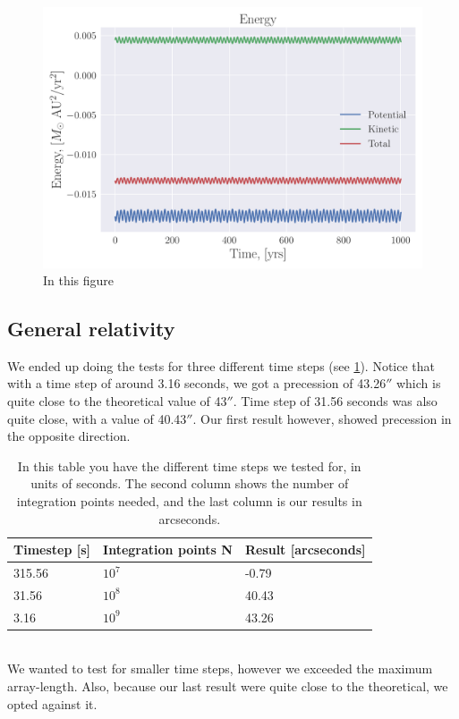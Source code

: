 \documentclass[reprint, english,notitlepage,nofootinbib]{revtex4-1}  %
\begin{document}
\begin{figure}[h]
	\centering
	\includegraphics[width=\linewidth]{../output/all-verlet-5-8-2_energy.pdf}
	\caption{In this figure 
		\label{fig:all_energy}}
\end{figure}

\subsection{General relativity}

We ended up doing the tests for three different time steps (see \ref{tab:general_relativity}). Notice that with a time step of around 3.16 seconds, we got a precession of 43.26$''$ which is quite close to the theoretical value of 43$''$. Time step of 31.56 seconds was also quite close, with a value of 40.43$''$. Our first result however, showed precession in the opposite direction.
\begin{table}[h]
	\begin{tabular}{|l|l|l|}
		\hline
		Timestep {[}s{]} & Integration points N & Result {[}arcseconds{]} \\
		\hline
		315.56              & $10^7$          & -0.79               \\
		31.56               & $10^8$          & 40.43                 \\
		3.16                & $10^9$          & 43.26	\\
		\hline                
	\end{tabular}
	\caption{In this table you have the different time steps we tested for, in units of seconds. The second column shows the number of integration points needed, and the last column is our results in arcseconds. 
	\label{tab:general_relativity}}
\end{table}
\\
We wanted to test for smaller time steps, however we exceeded the maximum array-length. Also, because our last result were quite close to the theoretical, we opted against it.
\end{document}
